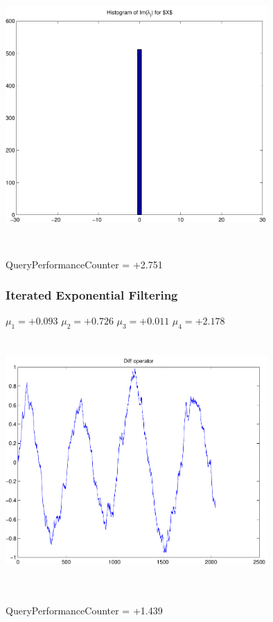 \documentclass[9pt]{article}
\theoremstyle{plain}
\theoremstyle{definition}
\theoremstyle{remark}
\numberwithin{equation}{section}
\begin{document}
\includegraphics[width=10.0cm,height=10.0cm]{Im_lambda_n.pdf}

QueryPerformanceCounter  =  +2.751
\subsubsection{Iterated Exponential Filtering }
$\mu_1 =+0.093$
$\mu_2 =+0.726$
$\mu_3 =+0.011$
$\mu_4 =+2.178$
\includegraphics[width=10.0cm,height=10.0cm]{DIFF.pdf}

QueryPerformanceCounter  =  +1.439
\end{document}

